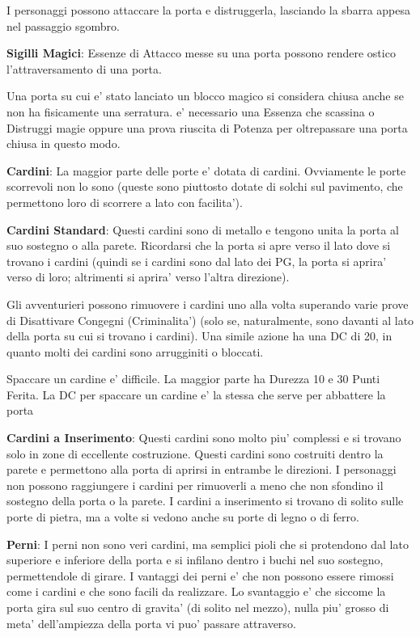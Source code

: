 \documentclass[a4paper,11pt,twoside,openany]{book}
\begin{document}
I personaggi possono attaccare la porta e distruggerla, lasciando la sbarra appesa nel passaggio sgombro.

\textbf{Sigilli Magici}: Essenze di Attacco messe su una porta possono rendere ostico l'attraversamento di una porta.

Una porta su cui e' stato lanciato un blocco magico si considera chiusa anche se non ha fisicamente una serratura. e' necessario una Essenza che scassina o Distruggi magie oppure una prova riuscita di Potenza per oltrepassare una porta chiusa in questo modo.

\textbf{Cardini}: La maggior parte delle porte e' dotata di cardini. Ovviamente le porte scorrevoli non lo sono (queste sono piuttosto dotate di solchi sul pavimento, che permettono loro di scorrere a lato con facilita').

\textbf{Cardini Standard}: Questi cardini sono di metallo e tengono unita la porta al suo sostegno o alla parete. Ricordarsi che la porta si apre verso il lato dove si trovano i cardini (quindi se i cardini sono dal lato dei PG, la porta si aprira' verso di loro; altrimenti si aprira' verso l’altra direzione). 

Gli avventurieri possono rimuovere i cardini uno alla volta superando varie prove di Disattivare Congegni (Criminalita') (solo se, naturalmente, sono davanti al lato della porta su cui si trovano i cardini). Una simile azione ha una DC di 20, in quanto molti dei cardini sono arrugginiti o bloccati. 

Spaccare un cardine e' difficile. La maggior parte ha Durezza 10 e 30 Punti Ferita. La DC per spaccare un cardine e' la stessa che serve per abbattere la porta

\textbf{Cardini a Inserimento}: Questi cardini sono molto piu' complessi e si trovano solo in zone di eccellente costruzione. Questi cardini sono costruiti dentro la parete e permettono alla porta di aprirsi in entrambe le direzioni. I personaggi non possono raggiungere i cardini per rimuoverli a meno che non sfondino il sostegno della porta o la parete. I cardini a inserimento si trovano di solito sulle porte di pietra, ma a volte si vedono anche su porte di legno o di ferro.

\textbf{Perni}: I perni non sono veri cardini, ma semplici pioli che si protendono dal lato superiore e inferiore della porta e si infilano dentro i buchi nel suo sostegno, permettendole di girare. I vantaggi dei perni e' che non possono essere rimossi come i cardini e che sono facili da realizzare. Lo svantaggio e' che siccome la porta gira sul suo centro di gravita' (di solito nel mezzo), nulla piu' grosso di meta' dell'ampiezza della porta vi puo' passare attraverso.
\end{document}
